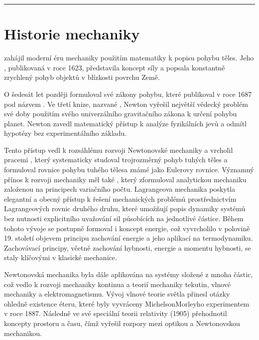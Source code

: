 \documentclass[letterpaper,10pt,english]{jupyterBook}
\begin{document}
\bigskip\hrule\bigskip



\section{Historie mechaniky}
\label{\detokenize{Prednasky/0_1_Definice_a_historie_mechaniky:historie-mechaniky}}
\sphinxAtStartPar
{} zahájil moderní éru mechaniky použitím matematiky k popisu pohybu těles. Jeho , publikovaná v roce 1623, představila koncept síly a popsala konstantně zrychlený pohyb objektů v blízkosti povrchu Země.

\sphinxAtStartPar
O šedesát let později  formuloval své zákony pohybu, které publikoval v roce 1687 pod názvem . Ve třetí knize, nazvané , Newton vyřešil největší vědecký problém své doby použitím svého univerzálního gravitačního zákona k určení pohybu planet. Newton zavedl matematický přístup k analýze fyzikálních jevů a odmítl hypotézy bez experimentálního základu.

\sphinxAtStartPar
Tento přístup vedl k rozsáhlému rozvoji Newtonovské mechaniky a vrcholil pracemi , který systematicky studoval trojrozměrný pohyb tuhých těles a formuloval rovnice pohybu tuhého tělesa známé jako Eulerovy rovnice. Významný přínos k rozvoji mechaniky měl také , který zformuloval analytickou mechaniku založenou na principech variačního počtu. Lagrangeova mechanika poskytla elegantní a obecný přístup k řešení mechanických problémů prostřednictvím Lagrangeových rovnic druhého druhu, které umožňují popis dynamiky systémů bez nutnosti explicitního uvažování sil působících na jednotlivé částice.
Během tohoto vývoje se postupně formoval i koncept energie, což vyvrcholilo v polovině 19. století objevem principu zachování energie a jeho aplikací na termodynamiku. Zachovávací principy, včetně zachování hybnosti, energie a momentu hybnosti, se staly klíčovými v klasické mechanice.

\sphinxAtStartPar
Newtonovská mechanika byla dále aplikována na systémy složené z mnoha částic, což vedlo k rozvoji mechaniky kontinua a teorií mechaniky tekutin, vlnové mechaniky a elektromagnetismu. Vývoj vlnové teorie světla přinesl otázky ohledně existence éteru, které byly vyvráceny Michelson\sphinxhyphen{}Morleyho experimentem v roce 1887. Následně  ve své speciální teorii relativity (1905) přehodnotil koncepty prostoru a času, čímž vyřešil rozpory mezi optikou a Newtonovskou mechanikou.
\end{document}
